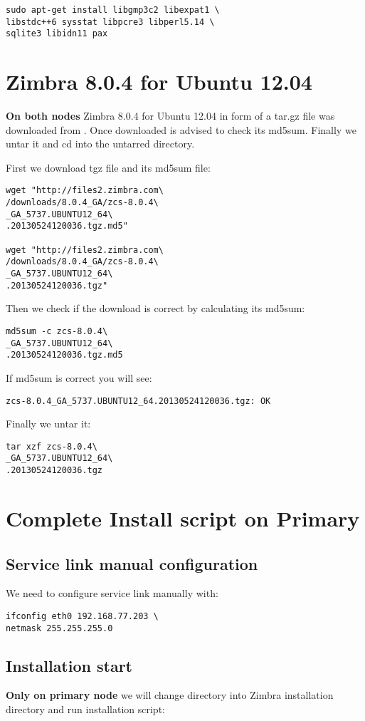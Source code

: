 \begin{verbatim}
sudo apt-get install libgmp3c2 libexpat1 \
libstdc++6 sysstat libpcre3 libperl5.14 \
sqlite3 libidn11 pax
\end{verbatim}

\section {Zimbra 8.0.4 for Ubuntu 12.04}
\textbf{On both nodes}
Zimbra 8.0.4 for Ubuntu 12.04 in form of a tar.gz file was downloaded from \cite{Zimbra8Download}.
Once downloaded is advised to check its md5sum. Finally we untar it and cd into the untarred directory.

First we download tgz file and its md5sum file:
\begin{verbatim}
wget "http://files2.zimbra.com\
/downloads/8.0.4_GA/zcs-8.0.4\
_GA_5737.UBUNTU12_64\
.20130524120036.tgz.md5"

wget "http://files2.zimbra.com\
/downloads/8.0.4_GA/zcs-8.0.4\
_GA_5737.UBUNTU12_64\
.20130524120036.tgz"
\end{verbatim}
Then we check if the download is correct by calculating its md5sum:
\begin{verbatim}
md5sum -c zcs-8.0.4\
_GA_5737.UBUNTU12_64\
.20130524120036.tgz.md5
\end{verbatim}
If md5sum is correct you will see:
\begin{verbatim}
zcs-8.0.4_GA_5737.UBUNTU12_64.20130524120036.tgz: OK
\end{verbatim}
Finally we untar it:
\begin{verbatim}
tar xzf zcs-8.0.4\
_GA_5737.UBUNTU12_64\
.20130524120036.tgz
\end{verbatim}

\section {\label{sec:complete-install-script-on-primary}Complete Install script on Primary}
\subsection {Service link manual configuration}
We need to configure service link manually with:
\begin{verbatim}
ifconfig eth0 192.168.77.203 \
netmask 255.255.255.0
\end{verbatim}

\subsection {Installation start}
\textbf{Only on primary node} we will change directory into Zimbra installation directory and run installation script:

